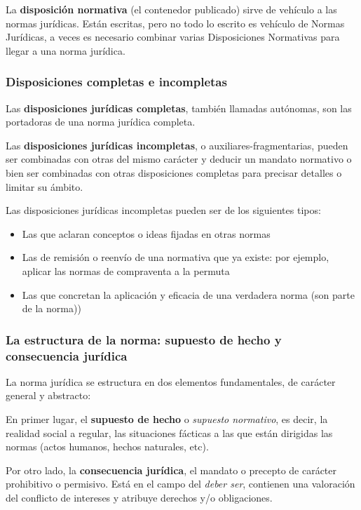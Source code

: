 \documentclass[a4paper,12pt]{report}
\begin{document}
La \textbf{disposición normativa} (el contenedor publicado) sirve de vehículo a
las normas jurídicas. Están escritas, pero no todo lo escrito es vehículo de
Normas Jurídicas, a veces es necesario combinar varias Disposiciones Normativas
para llegar a una norma jurídica.

\subsubsection{Disposiciones completas e incompletas}

Las \textbf{disposiciones jurídicas completas}, también llamadas autónomas, son
las portadoras de una norma jurídica completa.

Las \textbf{disposiciones jurídicas incompletas}, o auxiliares-fragmentarias,
pueden ser combinadas con otras del mismo carácter y deducir un mandato
normativo o bien ser combinadas con otras disposiciones completas para precisar
detalles o limitar su ámbito.

Las disposiciones jurídicas incompletas pueden ser de los siguientes tipos:

\begin{itemize}
\item{Las que aclaran conceptos o ideas fijadas en otras normas}
\item{Las de remisión o reenvío de una normativa que ya existe: por ejemplo,
    aplicar las normas de compraventa a la permuta}
\item{Las que concretan la aplicación y eficacia de una verdadera norma (son
    parte de la norma))}
\end{itemize}

\subsubsection{La estructura de la norma: supuesto de hecho y consecuencia
jurídica}

La norma jurídica se estructura en dos elementos fundamentales, de carácter
general y abstracto:

En primer lugar, el \textbf{supuesto de hecho} o \emph{supuesto normativo}, es
decir, la realidad social a regular, las situaciones fácticas a las que están
dirigidas las normas (actos humanos, hechos naturales, etc).

Por otro lado, la \textbf{consecuencia jurídica}, el mandato o precepto de
carácter prohibitivo o permisivo. Está en el campo del \emph{deber ser},
contienen una valoración del conflicto de intereses y atribuye derechos y/o
obligaciones.
\end{document}

